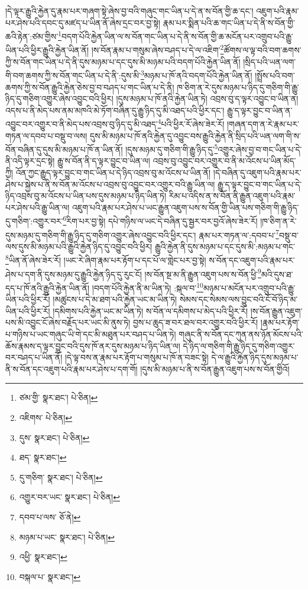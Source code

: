 །དེ་ལྟར་རྒྱུའི་རྐྱེན་དུ་རྣམ་པར་གཞག་སྟེ་ཞེས་བྱ་བའི་གཞུང་གང་ཡིན་པ་དེ་ན་ས་བོན་གྱི་ཆ་དང་། འཇུག་པའི་རྣམ་པར་ཤེས་པའི་དབང་དུ་མཛད་པ་ཡིན་ནོ་ཞེས་དྲང་བར་བྱ་སྟེ། རྣམ་པར་སྨིན་པའི་ཆ་གང་ཡིན་པ་དེ་ནི་ས་བོན་གྱི་ཆའི་རྟེན་:ཙམ་གྱིས་\footnote{ཙམ་གྱི་  སྣར་ཐང་།  པེ་ཅིན། }བདག་པོའི་རྐྱེན་ཡིན་ལ་ས་བོན་གང་ཡིན་པ་དེ་ནི་ས་བོན་གྱི་ཆ་མངོན་པར་འགྲུབ་པའི་རྒྱུ་ཡིན་པའི་ཕྱིར་རྒྱུའི་རྐྱེན་ཡིན་ནོ། །ས་བོན་རྣམ་པ་གསུམ་ཞེས་བཤད་པ་དེ་ལ་འཇིག་\footnote{འཇིགས་  པེ་ཅིན། }ཚོགས་ལ་ལྟ་བའི་བག་ཆགས་ཀྱི་ས་བོན་གང་ཡིན་པ་དེ་ནི་དུས་མཉམ་པ་དང་དུས་མི་མཉམ་པའི་བདག་པོའི་རྐྱེན་ཡིན་ནོ། །སྲིད་པའི་ཡན་ལག་གི་བག་ཆགས་ཀྱི་ས་བོན་གང་ཡིན་པ་དེ་ནི་:དུས་མི་\footnote{དུས་  སྣར་ཐང་།  པེ་ཅིན། }མཉམ་པ་ཁོ་ནའི་བདག་པོའི་རྐྱེན་ཡིན་ནོ། །སྤྲོས་པའི་བག་ཆགས་ཀྱི་ས་བོན་རྒྱུའི་རྐྱེན་ཅེས་བྱ་བ་བཤད་པ་གང་ཡིན་པ་དེ་ནི། ཁ་ཅིག་ན་རེ་དུས་མཉམ་པ་ཉིད་དུ་གཅིག་གི་རྒྱུ་ཉིད་དུ་གཅིག་འགྱུར་ཞེས་འབྱུང་བའི་ཕྱིར། །དུས་མཉམ་པ་ཁོ་ནའི་རྐྱེན་ཡིན་ཏེ། འབྲས་བུ་ད་ལྟར་འབྱུང་བ་ཡིན་ན། འདས་པ་ནི་མེད་པས་ནམ་མཁའི་མེ་ཏོག་བཞིན་དུ་རྒྱུ་ཉིད་དུ་མི་འཐད་པའི་ཕྱིར་དང་། རྒྱུ་ད་ལྟར་བྱུང་བ་ཡིན་ན་འབྱུང་བར་འགྱུར་བ་ནི་མེད་པས་འབྲས་བུ་ཉིད་དུ་མི་འཐད་\footnote{ཐད་  སྣར་ཐང་། }པའི་ཕྱིར་རོ་ཞེས་ཟེར་རོ། །གཞན་དག་ན་རེ་རྣམ་པར་གཏན་ལ་དབབ་པ་བསྡུ་བ་ལས། དུས་མི་མཉམ་པ་ཁོ་ནའི་རྐྱེན་དུ་འབྱུང་བས་རྒྱུའི་རྐྱེན་ནི་སྲིད་པའི་ཡན་ལག་གི་ས་བོན་བཞིན་དུ་དུས་མི་མཉམ་པ་ཁོ་ན་ཡིན་ནོ། །དུས་མཉམ་དུ་གཅིག་གི་རྒྱུ་ཉིད་དུ་\footnote{དུ་གཅིག་  སྣར་ཐང་།  པེ་ཅིན། }འགྱུར་ཞེས་བྱ་བ་གང་ཡིན་པ་དེ་ནི་འདི་ལྟར་དྲང་སྟེ། རྒྱུ་ས་བོན་ནི་ད་ལྟར་བྱུང་བ་ཡིན་ལ། འབྲས་བུ་འབྱུང་བར་འགྱུར་བ་ནི་མ་འོངས་པ་ཡིན་མོད་ཀྱི། འོན་ཀྱང་རྒྱུད་ལྟར་བྱུང་བ་གང་ཡིན་པ་དེ་ཉིད་འབྲས་བུ་མ་འོངས་པ་ཡིན་ནོ། །དེ་བཞིན་དུ་འཇུག་པའི་རྣམ་པར་ཤེས་པ་སྐྱེས་པ་ནི་ས་བོན་མ་འོངས་པ་འབྲས་བུ་འབྱུང་བར་འགྱུར་བའི་རྒྱུ་ཡིན་ལ། རྒྱུ་ད་ལྟར་བྱུང་བ་གང་ཡིན་པ་དེ་ཉིད་འབྲས་བུ་མ་འོངས་པ་ཡིན་པས་དུས་མཉམ་པ་ཉིད་ཡིན་ཏེ། རིམ་པ་འདིས་ན་ས་བོན་ནི་རྒྱུན་འཇུག་པའི་རྣམ་པར་ཤེས་པའི་རྒྱུ་ཡིན་ལ། འཇུག་པའི་རྣམ་པར་ཤེས་པ་ཡང་རྒྱུན་འཇུག་པས་ས་བོན་གྱི་ཡིན་པས་གཅིག་གི་རྒྱུ་ཉིད་དུ་གཅིག་:འགྱུར་བར་\footnote{འགྱུར་བར་ཡང་  སྣར་ཐང་།  པེ་ཅིན། }རིག་པར་བྱ་སྟེ། དཔེ་གཉིས་ལ་ཡང་དེ་བཞིན་དུ་སྦྱར་བར་བྱའོ་ཞེས་ཟེར་རོ། །ཁ་ཅིག་ན་རེ་དུས་མཉམ་དུ་གཅིག་གི་རྒྱུ་ཉིད་དུ་གཅིག་འགྱུར་ཞེས་འབྱུང་བའི་ཕྱིར་དང་། རྣམ་པར་གཏན་ལ་:དབབ་པ་\footnote{དབབ་པ་ལས་  ཅོ་ནེ། }བསྡུ་བ་ལས་དུས་མི་མཉམ་པའི་རྒྱུའི་རྐྱེན་ཉིད་དུ་འབྱུང་བའི་ཕྱིར། རྒྱུའི་རྐྱེན་ནི་དུས་མཉམ་པ་དང་དུས་མི་:མཉམ་པ་གང་\footnote{མཉམ་པ་ཡང་  སྣར་ཐང་།  པེ་ཅིན། }ཡིན་ནོ་ཞེས་ཟེར་རོ། །ཡང་རེ་ཞིག་རྣམ་པར་རྟོག་པ་དང་པོ་ལ་གླེང་པར་བྱ་སྟེ། ས་བོན་དང་འཇུག་པའི་རྣམ་པར་ཤེས་པ་དག་ནི་དུས་མཉམ་དུ་རྒྱུའི་རྐྱེན་ཉིད་དུ་རུང་ངོ། །ས་བོན་སྔ་མ་ནི་རྒྱུན་འཇུག་པས་ས་བོན་ཕྱི་\footnote{འཕྱི་  སྣར་ཐང་། }མའི་དུས་ཐ་དད་པ་ཁོ་ནའི་རྒྱུའི་རྐྱེན་ཡིན་ནོ། །བདག་པོའི་རྐྱེན་ནི་མ་ཡིན་ཏེ། :སྐལ་བ་\footnote{བསྐལ་པ་  སྣར་ཐང་། }མཉམ་པ་མངོན་པར་འགྲུབ་པའི་རྒྱུ་ཡིན་པའི་ཕྱིར་རོ། །མཚུངས་པ་དེ་མ་ཐག་པའི་རྐྱེན་ཡང་མ་ཡིན་ཏེ། སེམས་དང་སེམས་ལས་བྱུང་བའི་ངོ་བོ་ཉིད་མ་ཡིན་པའི་ཕྱིར་རོ། །དམིགས་པའི་རྐྱེན་ཡང་མ་ཡིན་ཏེ། ས་བོན་ལ་དམིགས་པ་མེད་པའི་ཕྱིར་རོ། །ས་བོན་རྒྱུན་འཇུག་པས་མི་འབྱུང་ངོ་ཞེས་བརྗོད་པར་ཡང་མི་ནུས་ཏེ། བྱས་པ་ཆུད་ཟ་བར་ཐལ་བར་འགྱུར་བའི་ཕྱིར་རོ། །རྣམ་པར་རྟོག་པ་གཉིས་པ་ཡང་གཞུང་ཡི་གེ་དང་མི་མཐུན་པར་བཤད་པ་ཡིན་ཏེ། གཞུང་ནི་ས་བོན་དང་ཀུན་ནས་ཉོན་མོངས་པའི་ཆོས་རྣམས་ད་ལྟར་བྱུང་བའི་དུས་ཁོ་ནར་དུས་མཉམ་པ་ཉིད་ཡིན་ལ། དེ་ཉིད་ལ་གཅིག་གི་རྒྱུ་ཉིད་དུ་གཅིག་འགྱུར་བར་བཤད་པ་ཡིན་ནོ། །དེ་ལྟ་བས་ན་རྣམ་པར་རྟོག་པ་གསུམ་པ་ཁོ་ན་བཟང་སྟེ། དེ་ལ་རྒྱུའི་རྐྱེན་ཉིད་དུས་མཉམ་པ་ནི་ས་བོན་དང་འཇུག་པའི་རྣམ་པར་ཤེས་པ་དག་གོ། །དུས་མི་མཉམ་པ་ནི་ས་བོན་རྒྱུན་འཇུག་པས་ས་བོན་གྱིའོ། 
